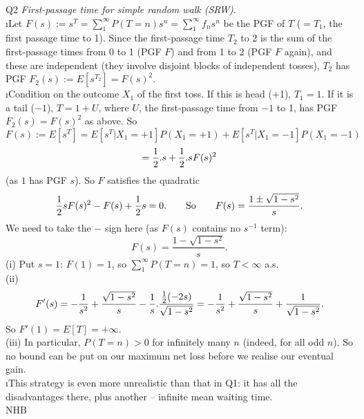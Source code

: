 \documentclass[12pt]{article}
\begin{document}
\ni Q2 {\it First-passage time for simple random walk (SRW)}. \\
\i Let $F(s) := s^T = \sum_1^{\infty} P(T = n) s^n = \sum_1^{\infty} f_n s^n$ be the PGF of $T$ ($= T_1$, the first passage time to 1).  Since the first-passage time $T_2$ to 2 is the sum of the first-passage times from 0 to 1 (PGF $F$) and from 1 to 2 (PGF $F$ again), and these are independent (they involve disjoint blocks of independent tosses), $T_2$ has PGF $F_2(s) := E[s^{T_2}] = F(s)^2$. \\
\i Condition on the outcome $X_1$ of the first toss.  If this is head (+1), $T_1 = 1$.  If it is a tail ($-1$), $T = 1 + U$, where $U$, the first-passage time from $-1$ to 1, has PGF $F_2(s) = F(s)^2$ as above.  So
$$
F(s) := E[s^T]
= E[s^T | X_1 = +1] P(X_1 = +1) + E[s^T | X_1 = -1] P(X_1 = -1)
$$
$$
= \frac{1}{2}.s + \frac{1}{2}.s F(s)^2
$$
(as $1$ has PGF $s$).  So $F$ satisfies the quadratic
$$
\frac{1}{2} s F(s)^2 - F(s) + \frac{1}{2} s = 0. \qquad \hbox{So} \qquad F(s) = \frac{1 \pm \sqrt{1 - s^2}}{s}.
$$
We need to take the $-$ sign here (as $F(s)$ contains no $s^{-1}$ term):
$$
F(s) = \frac{1 - \sqrt{1 - s^2}}{s}.
$$
(i) Put $s = 1$: $F(1) = 1$, so $\sum_1^{\infty} P(T = n) = 1$, so $T < \infty$ a.s. \\
(ii)
$$
F'(s) = - \frac{1}{s^2} + \frac{\sqrt{1 - s^2}}{s} - \frac{1}{s}.\frac{\frac{1}{2} (-2s)}{\sqrt{1 - s^2}}
= - \frac{1}{s^2} + \frac{\sqrt{1 - s^2}}{s} + \frac{1}{\sqrt{1 - s^2}}.
$$
So $F'(1) = E[T] = + \infty$. \\
(iii) In particular, $P(T = n) > 0$ for infinitely many $n$ (indeed, for all odd $n$).  So no bound can be put on our maximum net loss before we realise our eventual gain. \\
\i This strategy is even more unrealistic than that in Q1: it has all the disadvantages there, plus another -- infinite mean waiting time. \\

\hfil NHB \break
\end{document}
